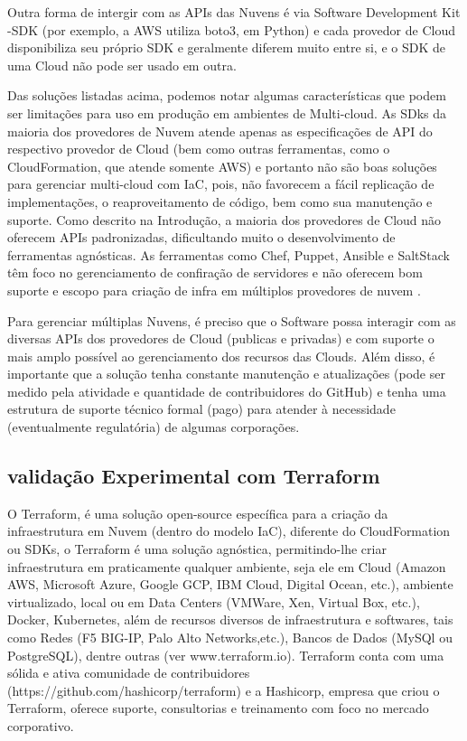 \documentclass[12pt]{article}
\begin{document}
	Outra forma de intergir com as APIs das Nuvens é via Software Development Kit -SDK (por exemplo, a AWS utiliza boto3, em Python) e cada provedor de Cloud disponibiliza seu próprio SDK e geralmente diferem muito entre si, e o SDK de uma Cloud não pode ser usado em outra.
	
	Das soluções listadas acima, podemos notar algumas características que podem ser limitações para uso em produção em ambientes de Multi-cloud. As SDks da maioria dos provedores de Nuvem atende apenas as especificações de API do respectivo provedor de Cloud (bem como outras ferramentas, como o CloudFormation, que atende somente AWS) e portanto não são boas soluções para gerenciar multi-cloud com IaC, pois, não favorecem a fácil replicação de implementações, o reaproveitamento de código, bem como sua manutenção e suporte. Como descrito na Introdução, a maioria dos provedores de Cloud não oferecem APIs padronizadas, dificultando muito o desenvolvimento de ferramentas agnósticas. As ferramentas como Chef, Puppet, Ansible e SaltStack têm foco no gerenciamento de confiração de servidores e não oferecem bom suporte e escopo para criação de infra em múltiplos provedores de nuvem \cite{Morris:2016}.
	
	Para gerenciar múltiplas Nuvens, é preciso que o Software possa interagir com as diversas APIs dos provedores de Cloud (publicas e privadas) e com suporte o mais amplo possível ao gerenciamento dos recursos das Clouds. Além disso, é importante que a solução tenha constante manutenção e atualizações (pode ser medido pela atividade e quantidade de contribuidores do GitHub) e tenha uma estrutura de suporte técnico formal (pago) para atender à necessidade (eventualmente regulatória) de algumas corporações.
	
	\subsection{validação Experimental com Terraform}
	
	O Terraform, é uma solução open-source específica para a criação da infraestrutura em Nuvem (dentro do modelo IaC), diferente do CloudFormation ou SDKs, o Terraform é uma solução agnóstica, permitindo-lhe criar infraestrutura em praticamente qualquer ambiente, seja ele em Cloud (Amazon AWS, Microsoft Azure, Google GCP, IBM Cloud, Digital Ocean, etc.), ambiente virtualizado, local ou em Data Centers (VMWare, Xen, Virtual Box, etc.), Docker, Kubernetes, além de recursos diversos de infraestrutura e softwares, tais como Redes (F5 BIG-IP, Palo Alto Networks,etc.), Bancos de Dados (MySQl ou PostgreSQL), dentre outras (ver www.terraform.io). Terraform conta com uma sólida e ativa comunidade de contribuidores (https://github.com/hashicorp/terraform) e a Hashicorp, empresa que criou o Terraform, oferece suporte, consultorias e treinamento com foco no mercado corporativo.
	
\end{document}
